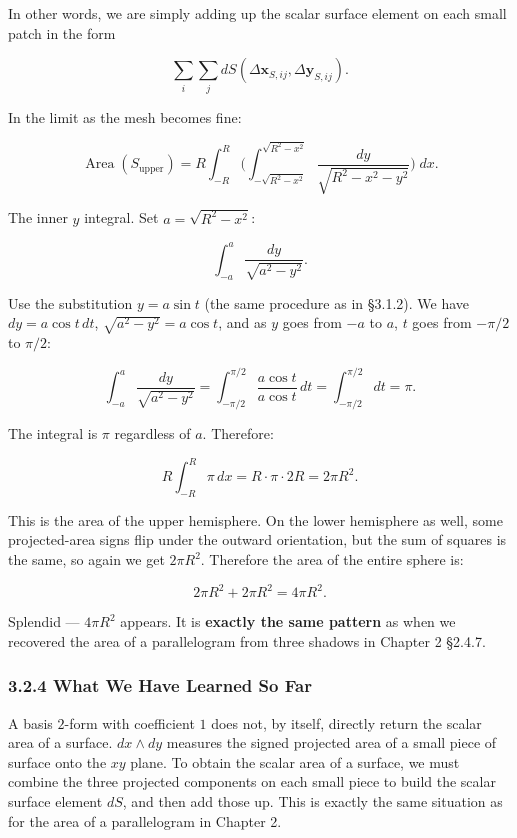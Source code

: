 In other words, we are simply adding up the scalar surface element on
each small patch in the form

\[\sum_i\sum_j dS(\Delta\mathbf{x}_{S,ij},\Delta\mathbf{y}_{S,ij}).\]

In the limit as the mesh becomes fine:

\[
\operatorname{Area}(S_{\text{upper}})
= R\int_{-R}^{R}\biggl(\int_{-\sqrt{R^2-x^2}}^{\sqrt{R^2-x^2}}
\frac{dy}{\sqrt{R^2 - x^2 - y^2}}\biggr)\;dx.
\]

The inner \(y\) integral. Set \(a = \sqrt{R^2 - x^2}\):

\[\int_{-a}^{a} \frac{dy}{\sqrt{a^2 - y^2}}.\]

Use the substitution \(y = a\sin t\) (the same procedure as in §3.1.2).
We have \(dy = a\cos t\,dt\), \(\sqrt{a^2 - y^2} = a\cos t\), and as
\(y\) goes from \(-a\) to \(a\), \(t\) goes from \(-\pi/2\) to
\(\pi/2\):

\[\int_{-a}^{a} \frac{dy}{\sqrt{a^2 - y^2}} = \int_{-\pi/2}^{\pi/2} \frac{a\cos t}{a\cos t}\,dt = \int_{-\pi/2}^{\pi/2} dt = \pi.\]

The integral is \(\pi\) regardless of \(a\). Therefore:

\[R\int_{-R}^{R} \pi\,dx = R \cdot \pi \cdot 2R = 2\pi R^2.\]

This is the area of the upper hemisphere. On the lower hemisphere as
well, some projected-area signs flip under the outward orientation, but
the sum of squares is the same, so again we get \(2\pi R^2\). Therefore
the area of the entire sphere is:

\[2\pi R^2 + 2\pi R^2 = 4\pi R^2.\]

Splendid --- \(4\pi R^2\) appears. It is
\textbf{exactly the same pattern} as when we recovered the area of a
parallelogram from three shadows in Chapter 2 §2.4.7.

\hypertarget{what-we-have-learned-so-far}{%
\subsubsection{3.2.4 What We Have Learned So
Far}\label{what-we-have-learned-so-far}}

A basis \(2\)-form with coefficient \(1\) does not, by itself, directly
return the scalar area of a surface. \(dx \wedge dy\) measures the
signed projected area of a small piece of surface onto the \(xy\) plane.
To obtain the scalar area of a surface, we must combine the three
projected components on each small piece to build the scalar surface
element \(dS\), and then add those up. This is exactly the same
situation as for the area of a parallelogram in Chapter 2.

